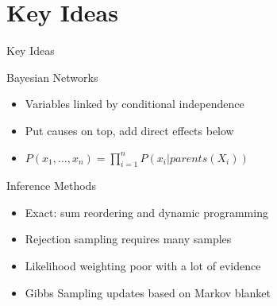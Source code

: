\documentclass[14pt]{beamer}
\begin{document}
\part{Key Ideas}
\begin{frame}{Key Ideas}
	\begin{block}{Bayesian Networks}
		\begin{itemize}
			\item Variables linked by conditional independence
			\item Put causes on top, add direct effects below
			\item $P(x_{1},\ldots,x_{n}) = \prod\limits_{i=1}^{n}{P(x_{i}|\textit{parents}(X_{i}))}$
		\end{itemize}
	\end{block}
	\begin{block}{Inference Methods}
		\begin{itemize}
			\item Exact: sum reordering and dynamic programming
			\item Rejection sampling requires many samples
			\item Likelihood weighting poor with a lot of evidence
			\item Gibbs Sampling updates based on Markov blanket
		\end{itemize}
	\end{block}
\end{frame}
\end{document}
